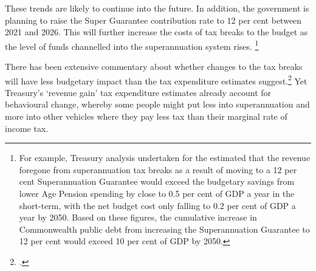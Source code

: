 These trends are likely to continue into the future. In addition, the government is planning to raise the Super Guarantee contribution rate to 12 per cent between 2021 and 2026. This will further increase the costs of tax breaks to the budget as the level of funds channelled into the superannuation system rises.%
\footnote{For example, Treasury analysis undertaken for the \textcite[][13]{CooperReview2013} estimated that the revenue foregone from superannuation tax breaks as a result of moving to a 12 per cent Superannuation Guarantee would exceed the budgetary savings from lower Age Pension spending by close to 0.5 per cent of GDP a year in the short-term, with the net budget cost only falling to 0.2 per cent of GDP a year by 2050. Based on these figures, the cumulative increase in Commonwealth public debt from increasing the Superannuation Guarantee to 12 per cent would exceed 10 per cent of GDP by 2050.} 

There has been extensive commentary about whether changes to the tax breaks will have less budgetary impact than the tax expenditure estimates suggest.\footcites{Clare2015}{ASFA2015TreasurySubmission}{Mercer2013a}{Carling2015} Yet Treasury’s ‘revenue gain’ tax expenditure estimates already account for behavioural change, whereby some people might put less into superannuation and more into other vehicles where they pay less tax than their marginal rate of income tax. 

